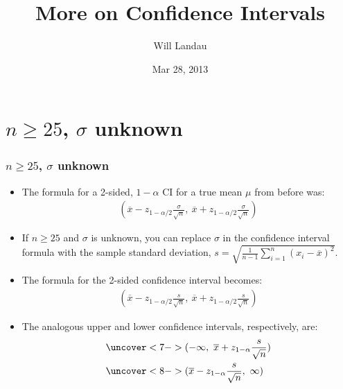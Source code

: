\documentclass[handout]{beamer}\usepackage{graphicx, color}
\title{More on Confidence Intervals}
\author{Will Landau}
\date{Mar 28, 2013}
\institute{Iowa State University}
\providecommand{\ov}[1]{\overline{#1}}
\numberwithin{equation}{section}
\begin{document}
\begin{frame}
\titlepage
 \end{frame}
 

\section{$n \ge 25$, $\sigma$ unknown}


\begin{frame}
\frametitle{$n \ge 25$, $\sigma$ unknown} \small
\begin{itemize}
\item The formula for a 2-sided, $1 - \alpha$ CI for a true mean $\mu$ from before was:
\pause \begin{align*}
(\ov{x} - z_{1 - \alpha/2} \frac{\sigma}{\sqrt{n}}, \ \ov{x} + z_{1 - \alpha/2} \frac{\sigma}{\sqrt{n}})
\end{align*}
\pause \item If $n \ge 25$ and $\sigma$ is unknown, you can replace $\sigma$ in the confidence interval formula with the sample standard deviation, $s = \sqrt{\frac{1}{n-1} \sum_{i = 1}^n (x_i - \ov{x})^2}$.
\pause \item The formula for the 2-sided confidence interval becomes:
\pause \begin{align*}
(\ov{x} - z_{1 - \alpha/2} \frac{s}{\sqrt{n}}, \ \ov{x} + z_{1 - \alpha/2} \frac{s}{\sqrt{n}})
\end{align*}
\pause \item The analogous upper and lower confidence intervals, respectively, are:
\begin{align*}
&\uncover<7->{(-\infty, \ \ov{x} + z_{1 - \alpha} \frac{s}{\sqrt{n}})} \\
&\uncover<8->{(\ov{x} - z_{1 - \alpha} \frac{s}{\sqrt{n}}, \ \infty)}
\end{align*}
\end{itemize}
\end{frame}
\end{document}

